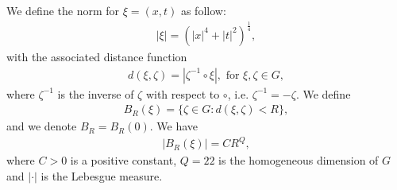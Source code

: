 \documentclass[reqno,12pt]{amsart}
\numberwithin{equation}{section}
\theoremstyle{plain}
\theoremstyle{definition}
\begin{document}
We define the norm for $\xi=(x,t)$ as follow:
\begin{align*}
    |\xi|=(|x|^4+|t|^2)^\frac{1}{4},
\end{align*}
with the associated distance function 
\begin{align*}
    d(\xi,\zeta)=|\zeta^{-1}\circ\xi|,\,\,\textrm{for}\,\,\xi,\zeta \in G,
\end{align*}
where $\zeta^{-1}$ is the inverse of $\zeta$ with respect to $\circ$, i.e. $\zeta^{-1}=-\zeta$.
We define
\begin{align*}
    B_R(\xi)=\{\zeta\in G:d(\xi, \zeta)<R\},
\end{align*}
and we denote $B_R=B_R(0)$. We have
\begin{align*}
    |B_R(\xi)|=CR^Q,
\end{align*}
where $C>0$ is a positive constant, $Q=22$ is the homogeneous dimension of $G$ and $|\cdot|$ is the Lebesgue measure.
\end{document}
